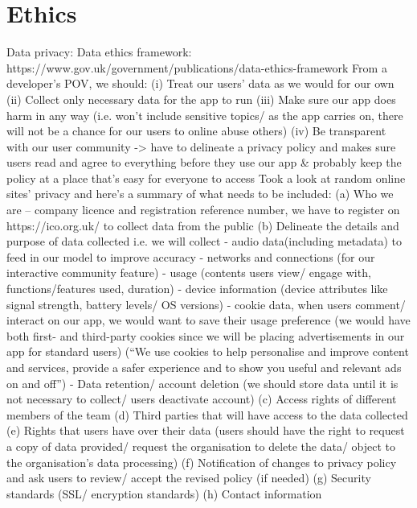 \section{Ethics}
Data privacy:
Data ethics framework: https://www.gov.uk/government/publications/data-ethics-framework
From a developer’s POV, we should:
(i)	Treat our users’ data as we would for our own
(ii)	Collect only necessary data for the app to run
(iii)	Make sure our app does harm in any way (i.e. won’t include sensitive topics/ as the app carries on, there will not be a chance for our users to online abuse others)
(iv)	Be transparent with our user community -> have to delineate a privacy policy and makes sure users read and agree to everything before they use our app & probably keep the policy at a place that’s easy for everyone to access
Took a look at random online sites’ privacy and here’s a summary of what needs to be included:
(a)	Who we are – company licence and registration reference number, we have to register on https://ico.org.uk/ to collect data from the public
(b)	Delineate the details and purpose of data collected
i.e. we will collect 
- audio data(including metadata) to feed in our model to improve accuracy
- networks and connections (for our interactive community feature)
- usage (contents users view/ engage with, functions/features used, duration)
- device information (device attributes like signal strength, battery levels/ OS versions)
- cookie data, when users comment/ interact on our app, we would want to save their usage preference (we would have both first- and third-party cookies since we will be placing advertisements in our app for standard users) (“We use cookies to help personalise and improve content and services, provide a safer experience and to show you useful and relevant ads on and off”)
- Data retention/ account deletion (we should store data until it is not necessary to collect/ users deactivate account)
(c)	Access rights of different members of the team
(d)	Third parties that will have access to the data collected
(e)	Rights that users have over their data (users should have the right to request a copy of data provided/ request the organisation to delete the data/ object to the organisation’s data processing)
(f)	Notification of changes to privacy policy and ask users to review/ accept the revised policy (if needed)
(g)	Security standards (SSL/ encryption standards)
(h)	Contact information

